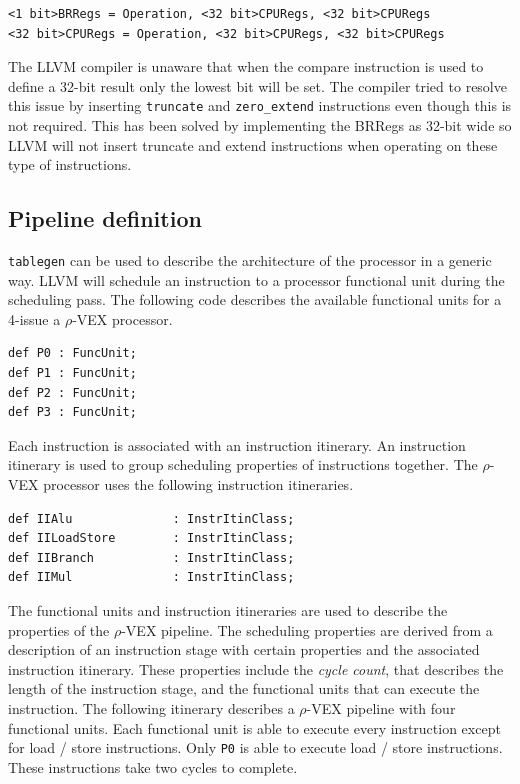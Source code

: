 \begin{lstlisting}
<1 bit>BRRegs = Operation, <32 bit>CPURegs, <32 bit>CPURegs
<32 bit>CPURegs = Operation, <32 bit>CPURegs, <32 bit>CPURegs
\end{lstlisting}

The LLVM compiler is unaware that when the compare instruction is used to define a 32-bit result only the lowest bit will be set. The compiler tried to resolve this issue by inserting \texttt{truncate} and \texttt{zero\_extend} instructions even though this is not required. This has been solved by implementing the BRRegs as 32-bit wide so LLVM will not insert truncate and extend instructions when operating on these type of instructions.

\subsection{Pipeline definition}
\texttt{tablegen} can be used to describe the architecture of the processor in a generic way. LLVM will schedule an instruction to a processor functional unit during the scheduling pass. The following code describes the available functional units for a 4-issue a $\rho$-VEX processor.

\pagebreak

\begin{lstlisting}[language=tblgen]
def P0 : FuncUnit;
def P1 : FuncUnit;
def P2 : FuncUnit;
def P3 : FuncUnit;
\end{lstlisting}

Each instruction is associated with an instruction itinerary. An instruction itinerary is used to group scheduling properties of instructions together. The $\rho$-VEX processor uses the following instruction itineraries.

\begin{lstlisting}[language=tblgen]
def IIAlu              : InstrItinClass;
def IILoadStore        : InstrItinClass;
def IIBranch           : InstrItinClass;
def IIMul              : InstrItinClass;
\end{lstlisting}

The functional units and instruction itineraries are used to describe the properties of the $\rho$-VEX pipeline. The scheduling properties are derived from a description of an instruction stage with certain properties and the associated instruction itinerary. These properties include the \emph{cycle count}, that describes the length of the instruction stage, and the functional units that can execute the instruction. The following itinerary describes a $\rho$-VEX pipeline with four functional units. Each functional unit is able to execute every instruction except for load / store instructions. Only \texttt{P0} is able to execute load / store instructions. These instructions take two cycles to complete.

